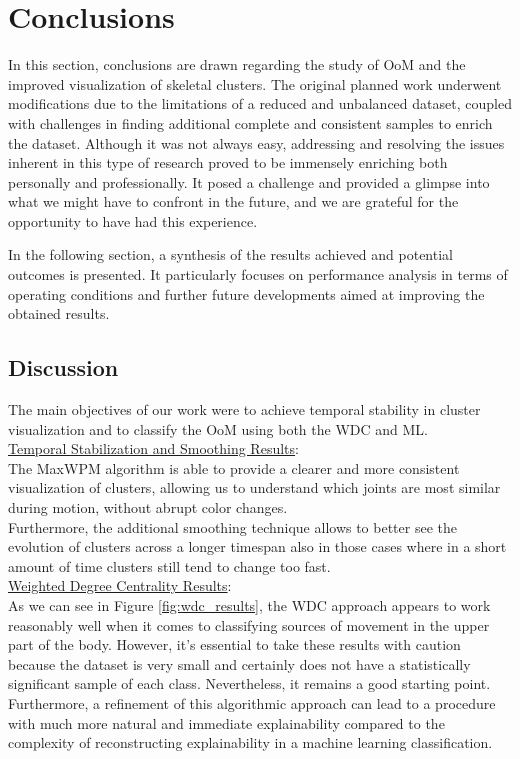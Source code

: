 \chapter{Conclusions}
In this section, conclusions are drawn regarding the study of OoM and the improved visualization of skeletal clusters.
The original planned work underwent modifications due to the limitations of a reduced and unbalanced dataset, coupled with challenges in finding additional complete and consistent samples to enrich the dataset.
Although it was not always easy, addressing and resolving the issues inherent in this type of research proved to be immensely enriching both personally and professionally.
It posed a challenge and provided a glimpse into what we might have to confront in the future, and we are grateful for the opportunity to have had this experience.

In the following section, a synthesis of the results achieved and potential outcomes is presented.
It particularly focuses on performance analysis in terms of operating conditions and further future developments aimed at improving the obtained results.

\section{Discussion}
The main objectives of our work were to achieve temporal stability in cluster visualization and to classify the OoM using both the WDC and ML.\\

\underline{Temporal Stabilization and Smoothing Results}:\\
The MaxWPM algorithm is able to provide a clearer and more consistent visualization of clusters, allowing us to understand which joints are most similar during motion, without abrupt color changes. \\
Furthermore, the additional smoothing technique allows to better see the evolution of clusters across a longer timespan also in those cases where in a short amount of time clusters still tend to change too fast.\\

\underline{Weighted Degree Centrality Results}:\\
As we can see in Figure \ref*{fig:wdc_results}, the WDC approach appears to work reasonably well when it comes to classifying sources of movement in the upper part of the body. 
However, it's essential to take these results with caution because the dataset is very small and certainly does not have a statistically significant sample of each class. 
Nevertheless, it remains a good starting point. \\
Furthermore, a refinement of this algorithmic approach can lead to a procedure with much more natural and immediate explainability 
compared to the complexity of reconstructing explainability in a machine learning classification.\\

